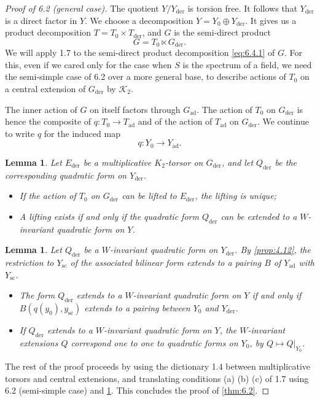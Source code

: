 \documentclass[11pt,a4paper]{article}
\theoremstyle{plain}
\newtheorem{lemma}[theorem]{Lemma}
\theoremstyle{definition}
\newcommand{\cK}{\mathcal{K}}
\newcommand{\der}{\mathrm{der}}
\newcommand{\scu}{\mathrm{sc}}
\newcommand{\ad}{\mathrm{ad}}
\begin{document}
\begin{proof}[Proof of 6.2 (general case)]
The quotient $Y/Y_\der$ is torsion free. It follows that $Y_\der$ is a direct factor in $Y$. We choose a decomposition $Y = Y_0 \oplus Y_\der$. It gives us a product decomposition $T = T_0 \times T_\der$, and $G$ is the semi-direct product
\begin{equation}\label{eq:6.4.1}
G = T_0 \ltimes G_\der.
\end{equation}
We will apply 1.7 to the semi-direct product decomposition \eqref{eq:6.4.1} of $G$. For this, even if we cared only for the case when $S$ is the spectrum of a field, we need the semi-simple case of 6.2 over a more general base, to describe actions of $T_0$ on a central extension of $G_\der$ by $\cK_2$.

The inner action of $G$ on itself factors through $G_\ad$. The action of $T_0$ on $G_\der$ is hence the composite of $q: T_0 \to T_\ad$ and of the action of $T_\ad$ on $G_\der$. We continue to write $q$ for the induced map
\begin{equation}\label{eq:6.4.2}
q: Y_0 \to Y_\ad.
\end{equation}

\begin{lemma}\label{lem:6.5}
Let $E_\der$ be a multiplicative $K_2$-torsor on $G_\der$, and let $Q_\der$ be the corresponding quadratic form on $Y_\der$.
\begin{itemize}
\item[(i)] If the action of $T_0$ on $G_\der$ can be lifted to $E_\der$, the lifting is unique;
\item[(ii)] A lifting exists if and only if the quadratic form $Q_\der$ can be extended to a $W$-invariant quadratic form on $Y$.
\end{itemize}
\end{lemma}

\begin{lemma}\label{lem:6.6}
Let $Q_\der$ be a $W$-invariant quadratic form on $Y_\der$. By \ref{prop:4.12}, the restriction to $Y_\scu$ of the associated bilinear form extends to a pairing $B$ of $Y_\ad$ with $Y_\scu$.
\begin{itemize}
\item[(i)] The form $Q_\der$ extends to a $W$-invariant quadratic form on $Y$ if and only if $B(q(y_0), y_\scu)$ extends to a pairing between $Y_0$ and $Y_\der$.
\item[(ii)] If $Q_\der$ extends to a $W$-invariant quadratic form on $Y$, the $W$-invariant extensions $Q$ correspond one to one to quadratic forms on $Y_0$, by $Q \mapsto Q|_{Y_0}$.
\end{itemize}
\end{lemma}

The rest of the proof proceeds by using the dictionary 1.4 between multiplicative torsors and central extensions, and translating conditions (a) (b) (c) of 1.7 using 6.2 (semi-simple case) and \ref{lem:6.5}. This concludes the proof of \ref{thm:6.2}.
\end{proof}
\end{document}
